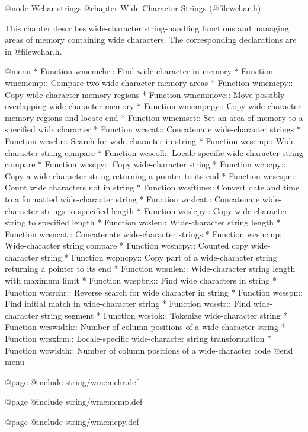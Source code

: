 @node Wchar strings
@chapter Wide Character Strings (@file{wchar.h})

This chapter describes wide-character string-handling functions and
managing areas of memory containing wide characters.  The corresponding 
declarations are in @file{wchar.h}.

@menu
* Function wmemchr::     Find wide character in memory
* Function wmemcmp::     Compare two wide-character memory areas
* Function wmemcpy::     Copy wide-character memory regions
* Function wmemmove::    Move possibly overlapping wide-character memory
* Function wmempcpy::    Copy wide-character memory regions and locate end
* Function wmemset::     Set an area of memory to a specified wide character
* Function wcscat::      Concatenate wide-character strings
* Function wcschr::      Search for wide character in string
* Function wcscmp::      Wide-character string compare
* Function wcscoll::     Locale-specific wide-character string compare
* Function wcscpy::      Copy wide-character string
* Function wcpcpy::      Copy a wide-character string returning a pointer to its end
* Function wcscspn::     Count wide characters not in string
* Function wcsftime::    Convert date and time to a formatted wide-character string
* Function wcslcat::     Concatenate wide-character strings to specified length
* Function wcslcpy::     Copy wide-character string to specified length
* Function wcslen::      Wide-character string length
* Function wcsncat::     Concatenate wide-character strings
* Function wcsncmp::     Wide-character string compare
* Function wcsncpy::     Counted copy wide-character string
* Function wcpncpy::     Copy part of a wide-character string returning a pointer to its end
* Function wcsnlen::     Wide-character string length with maximum limit
* Function wcspbrk::     Find wide characters in string
* Function wcsrchr::     Reverse search for wide character in string
* Function wcsspn::      Find initial match in wide-character string
* Function wcsstr::      Find wide-character string segment
* Function wcstok::      Tokenize wide-character string
* Function wcswidth::    Number of column positions of a wide-character string
* Function wcsxfrm::     Locale-specific wide-character string transformation
* Function wcwidth::     Number of column positions of a wide-character code
@end menu

@page
@include string/wmemchr.def

@page
@include string/wmemcmp.def

@page
@include string/wmemcpy.def

